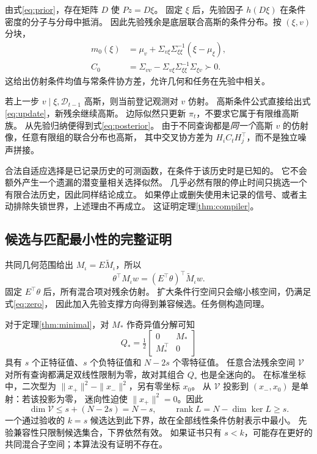 \documentclass[11pt,a4paper]{article}
\numberwithin{equation}{section}
\theoremstyle{definition}
\newcommand{\D}{\mathcal D}
\DeclareMathOperator{\rank}{rank}
\begin{document}
由式\eqref{eq:prior}，存在矩阵 \(D\) 使 \(Pz=D\xi\)。
固定 \(\xi\) 后，先验因子 \(h(D\xi)\) 在条件密度的分子与分母中抵消。
因此先验残余是底层联合高斯的条件分布。按 \((\xi,v)\) 分块，
\begin{align*}
 m_0(\xi)&=\mu_v+\Sigma_{v\xi}\Sigma_{\xi\xi}^{-1}(\xi-\mu_\xi),\\
 C_0&=\Sigma_{vv}-\Sigma_{v\xi}\Sigma_{\xi\xi}^{-1}\Sigma_{\xi v}\succ0 .
\end{align*}
这给出仿射条件均值与常条件协方差，允许几何和任务在先验中相关。

若上一步 \(v\mid\xi,\D_{t-1}\) 高斯，则当前登记观测对 \(v\) 仿射。
高斯条件公式直接给出式\eqref{eq:update}，新残余继续高斯。
边际似然只更新 \(\pi_t\)，不要求它属于有限维高斯族。
从先验归纳便得到式\eqref{eq:posterior}。
由于不同查询都是\emph{同一个}高斯 \(v\) 的仿射像，任意有限组的联合分布也高斯，
其中交叉协方差为 \(H_iC_tH_j^\top\)，而不是独立噪声拼接。

合法自适应选择是已记录历史的可测函数，在条件于该历史时是已知的。
它不会额外产生一个遗漏的潜变量相关选择似然。
几乎必然有限的停止时间只挑选一个有限合法历史，因此同样结论成立。
如果停止或删失使用未记录的信号、或者主动排除失锁世界，上述理由不再成立。
这证明定理\ref{thm:compiler}。

\subsection{候选与匹配最小性的完整证明}
共同几何范围给出 \(M_\iota=E\widetilde M_\iota\)，所以
\[
 \theta^\top M_\iota w=(E^\top\theta)^\top\widetilde M_\iota w .
\]
固定 \(E^\top\theta\) 后，所有混合项对残余仿射。
扩大条件行空间只会缩小核空间，仍满足式\eqref{eq:zero}，
因此加入先验支撑方向得到兼容候选。任务侧构造同理。

对于定理\ref{thm:minimal}，对 \(M_*\) 作奇异值分解可知
\[
 Q_* =\tfrac12\begin{bmatrix}0&M_*\\M_*^\top&0\end{bmatrix}
\]
具有 \(s\) 个正特征值、\(s\) 个负特征值和 \(N-2s\) 个零特征值。
任意合法残余空间 \(\mathcal V\) 对所有查询都满足双线性限制为零，故对其组合 \(Q_*\) 也是全迷向的。
在标准坐标中，二次型为 \(\|x_+\|^2-\|x_-\|^2\)，另有零坐标 \(x_0\)。
从 \(\mathcal V\) 投影到 \((x_-,x_0)\) 是单射：若该投影为零，
迷向性迫使 \(\|x_+\|^2=0\)。因此
\[
 \dim\mathcal V\le s+(N-2s)=N-s,
 \qquad \rank L=N-\dim\ker L\ge s .
\]
一个通过验收的 \(k=s\) 候选达到此下界，故在全部线性条件仿射表示中最小。
先验兼容性只限制候选集合，下界依然有效。
如果证书只有 \(s<k\)，可能存在更好的共同混合子空间；本算法没有证明不存在。
\end{document}

